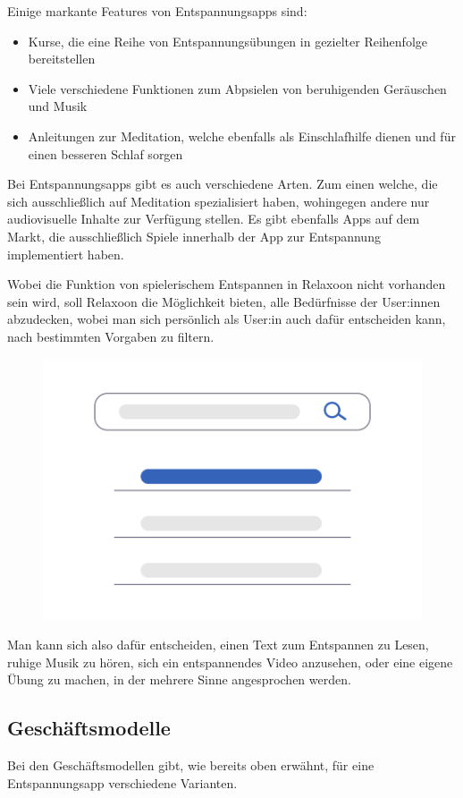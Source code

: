 Einige markante Features von Entspannungsapps sind:

\begin{itemize}
    \item Kurse, die eine Reihe von Entspannungsübungen in gezielter Reihenfolge bereitstellen
    \item Viele verschiedene Funktionen zum Abpsielen von beruhigenden Geräuschen und Musik
    \item Anleitungen zur Meditation, welche ebenfalls als Einschlafhilfe dienen und für einen besseren Schlaf sorgen
\end{itemize}

Bei Entspannungsapps gibt es auch verschiedene Arten. Zum einen welche, die sich ausschließlich auf Meditation
spezialisiert haben, wohingegen andere nur audiovisuelle Inhalte zur Verfügung stellen. Es gibt ebenfalls Apps auf
dem Markt, die ausschließlich Spiele innerhalb der App zur Entspannung implementiert haben. 

Wobei die Funktion von spielerischem Entspannen in Relaxoon nicht vorhanden sein wird, soll Relaxoon
die Möglichkeit bieten, alle Bedürfnisse der User:innen abzudecken, wobei man sich persönlich als User:in 
auch dafür entscheiden kann, nach bestimmten Vorgaben zu filtern.

\begin{figure}[H]
    \centering
    \includegraphics[height=0.35\textwidth]{./pics/undraw_Search_re_x5gq.png}
    \caption{}
\end{figure}

Man kann sich also dafür entscheiden, einen Text
zum Entspannen zu Lesen, ruhige Musik zu hören, sich ein entspannendes Video anzusehen, oder eine eigene Übung
zu machen, in der mehrere Sinne angesprochen werden.

\subsection{Geschäftsmodelle}

Bei den Geschäftsmodellen gibt, wie bereits oben erwähnt, für eine Entspannungsapp verschiedene Varianten. 

